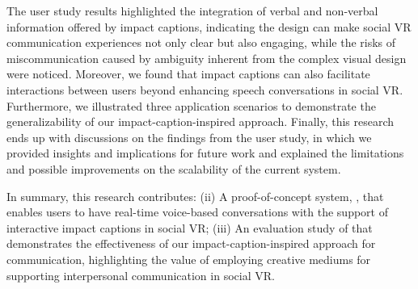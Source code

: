 The user study results highlighted the integration of verbal and non-verbal information offered by impact captions, indicating the design can make social VR communication experiences not only clear but also engaging, while the risks of miscommunication caused by ambiguity inherent from the complex visual design were noticed.
Moreover, we found that impact captions can also facilitate interactions between users beyond enhancing speech conversations in social VR.
Furthermore, we illustrated three application scenarios to demonstrate the generalizability of our impact-caption-inspired approach. 
Finally, this research ends up with discussions on the findings from the user study, in which we provided insights and implications for future work and explained the limitations and possible improvements on the scalability of the current \system{} system.

In summary, this research contributes:
(ii) A proof-of-concept system, \system{}, that enables users to have real-time voice-based conversations with the support of interactive impact captions in social VR;
(iii) An evaluation study of \system{} that demonstrates the effectiveness of our impact-caption-inspired approach for communication, highlighting the value of employing creative mediums for supporting interpersonal communication in social VR.


